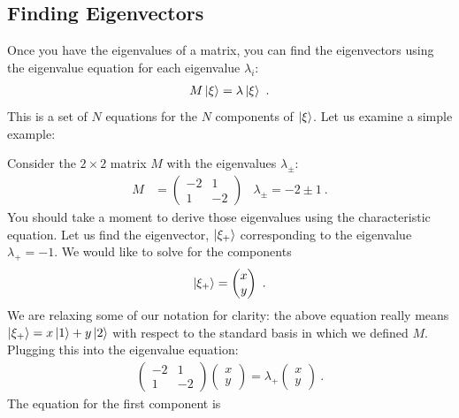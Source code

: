 \documentclass[12pt]{article}
\begin{document}
\subsection{Finding Eigenvectors}

Once you have the eigenvalues of a matrix, you can find the eigenvectors using the eigenvalue equation for each eigenvalue $\lambda_i$:
\begin{align}
    M\left|\xi\right\rangle = \lambda \left|\xi\right\rangle \ .
\end{align}
This is a set of $N$ equations for the $N$ components of $\left|\xi\right\rangle$. Let us examine a simple example:
\begin{example}
Consider the $2\times 2$ matrix $M$ with the eigenvalues $\lambda_\pm$:
\begin{align}
    M &=
    \begin{pmatrix}
        -2 & 1\\
        1 & -2
    \end{pmatrix}
    &
    \lambda_\pm = -2 \pm 1 \ .
\end{align}
You should take a moment to derive those eigenvalues using the characteristic equation. Let us find the eigenvector, $\left|\xi_+\right\rangle$ corresponding to the eigenvalue $\lambda_+ = -1$. We would like to solve for the components
\begin{align}
    \left|\xi_+\right\rangle
    =
    \begin{pmatrix}
        x\\y
    \end{pmatrix} \ .
\end{align}
We are relaxing some of our notation for clarity: the above equation really means $\left|\xi_+\right\rangle=x\left|1\right\rangle + y\left|2\right\rangle$ with respect to the standard basis in which we defined $M$. Plugging this into the eigenvalue equation:
\begin{align}
   \begin{pmatrix}
        -2 & 1\\
        1 & -2
    \end{pmatrix}
    \begin{pmatrix}
        x\\y
    \end{pmatrix}
    = 
    \lambda_+
    \begin{pmatrix}
        x\\y
    \end{pmatrix} \ .
    \label{eq:ex:eigenvector:finding:1}
\end{align}
The equation for the first component is
\begin{align}

\end{align}
\end{example}
\end{document}
